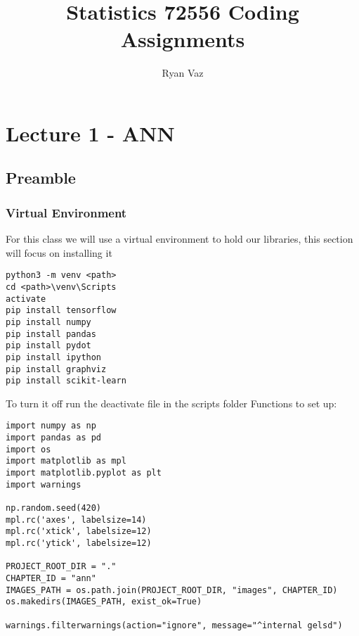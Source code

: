 \documentclass[article]{llncs}
\begin{document}
%
\graphicspath{ {./images/} }
\title{Statistics 72556 Coding Assignments}
%
%
\author{Ryan Vaz}
%
%
%
\maketitle              %
%

%
\begingroup
\let\clearpage\relax
\tableofcontents*
\endgroup
%

\section{Lecture 1 - ANN}
\subsection{Preamble}
\subsubsection{Virtual Environment}
For this class we will use a virtual environment to hold our libraries, this section will focus on installing it\\

\begin{verbatim}
python3 -m venv <path>
cd <path>\venv\Scripts
activate
pip install tensorflow
pip install numpy
pip install pandas
pip install pydot
pip install ipython
pip install graphviz
pip install scikit-learn
\end{verbatim}
\noindent To turn it off run the deactivate file in the scripts folder 
Functions to set up:
\begin{verbatim}
import numpy as np
import pandas as pd
import os
import matplotlib as mpl
import matplotlib.pyplot as plt
import warnings

np.random.seed(420)
mpl.rc('axes', labelsize=14)
mpl.rc('xtick', labelsize=12)
mpl.rc('ytick', labelsize=12)

PROJECT_ROOT_DIR = "."
CHAPTER_ID = "ann"
IMAGES_PATH = os.path.join(PROJECT_ROOT_DIR, "images", CHAPTER_ID)
os.makedirs(IMAGES_PATH, exist_ok=True)

warnings.filterwarnings(action="ignore", message="^internal gelsd")
\end{verbatim}
\end{document}
